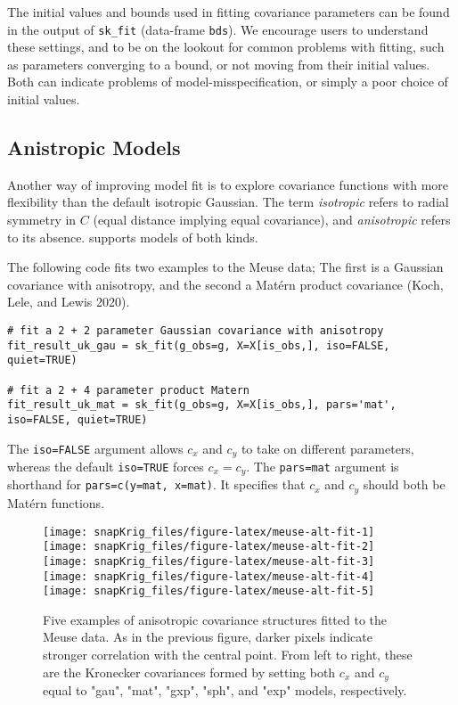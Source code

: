 The initial values and bounds used in fitting covariance parameters can be found in the output of \texttt{sk\_fit} (data-frame \texttt{bds}). We encourage users to understand these settings, and to be on the lookout for common problems with fitting, such as parameters converging to a bound, or not moving from their initial values. Both can indicate problems of model-misspecification, or simply a poor choice of initial values.

\hypertarget{anistropic-models}{%
\subsection{Anistropic Models}\label{anistropic-models}}

Another way of improving model fit is to explore covariance functions with more flexibility than the default isotropic Gaussian. The term \emph{isotropic} refers to radial symmetry in \(C\) (equal distance implying equal covariance), and \emph{anisotropic} refers to its absence.  supports models of both kinds.

The following code fits two examples to the Meuse data; The first is a Gaussian covariance with anisotropy, and the second a Matérn product covariance (Koch, Lele, and Lewis 2020).

\begin{verbatim}
# fit a 2 + 2 parameter Gaussian covariance with anisotropy
fit_result_uk_gau = sk_fit(g_obs=g, X=X[is_obs,], iso=FALSE, quiet=TRUE)

# fit a 2 + 4 parameter product Matern
fit_result_uk_mat = sk_fit(g_obs=g, X=X[is_obs,], pars='mat', iso=FALSE, quiet=TRUE)
\end{verbatim}

The \texttt{iso=FALSE} argument allows \(c_x\) and \(c_y\) to take on different parameters, whereas the default \texttt{iso=TRUE} forces \(c_x=c_y\). The \texttt{pars=\textquotesingle{}mat\textquotesingle{}} argument is shorthand for \texttt{pars=c(y=\textquotesingle{}mat\textquotesingle{},\ x=\textquotesingle{}mat\textquotesingle{})}. It specifies that \(c_x\) and \(c_y\) should both be Matérn functions.

\begin{figure}[!htb]
\texttt{[image: snapKrig\_files/figure-latex/meuse-alt-fit-1]} \texttt{[image: snapKrig\_files/figure-latex/meuse-alt-fit-2]} \texttt{[image: snapKrig\_files/figure-latex/meuse-alt-fit-3]} \texttt{[image: snapKrig\_files/figure-latex/meuse-alt-fit-4]} \texttt{[image: snapKrig\_files/figure-latex/meuse-alt-fit-5]} \caption{Five examples of anisotropic covariance structures fitted to the Meuse data. As in the previous figure, darker pixels indicate stronger correlation with the central point. From left to right, these are the Kronecker covariances formed by setting both $c_x$ and $c_y$ equal to "gau", "mat", "gxp", "sph", and "exp" models, respectively.}\label{fig:meuse-alt-fit}
\end{figure}

